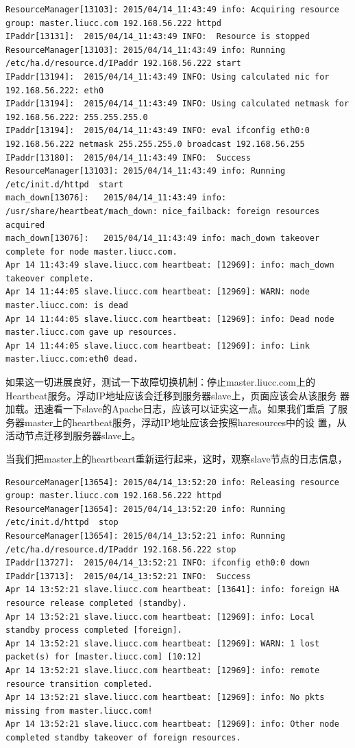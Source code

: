 \begin{verbatim}
ResourceManager[13103]:	2015/04/14_11:43:49 info: Acquiring resource group: master.liucc.com 192.168.56.222 httpd
IPaddr[13131]:	2015/04/14_11:43:49 INFO:  Resource is stopped
ResourceManager[13103]:	2015/04/14_11:43:49 info: Running /etc/ha.d/resource.d/IPaddr 192.168.56.222 start
IPaddr[13194]:	2015/04/14_11:43:49 INFO: Using calculated nic for 192.168.56.222: eth0
IPaddr[13194]:	2015/04/14_11:43:49 INFO: Using calculated netmask for 192.168.56.222: 255.255.255.0
IPaddr[13194]:	2015/04/14_11:43:49 INFO: eval ifconfig eth0:0 192.168.56.222 netmask 255.255.255.0 broadcast 192.168.56.255
IPaddr[13180]:	2015/04/14_11:43:49 INFO:  Success
ResourceManager[13103]:	2015/04/14_11:43:49 info: Running /etc/init.d/httpd  start
mach_down[13076]:	2015/04/14_11:43:49 info: /usr/share/heartbeat/mach_down: nice_failback: foreign resources acquired
mach_down[13076]:	2015/04/14_11:43:49 info: mach_down takeover complete for node master.liucc.com.
Apr 14 11:43:49 slave.liucc.com heartbeat: [12969]: info: mach_down takeover complete.
Apr 14 11:44:05 slave.liucc.com heartbeat: [12969]: WARN: node master.liucc.com: is dead
Apr 14 11:44:05 slave.liucc.com heartbeat: [12969]: info: Dead node master.liucc.com gave up resources.
Apr 14 11:44:05 slave.liucc.com heartbeat: [12969]: info: Link master.liucc.com:eth0 dead.
\end{verbatim}

如果这一切进展良好，测试一下故障切换机制：停止master.liucc.com上的
Heartbeat服务。浮动IP地址应该会迁移到服务器slave上，页面应该会从该服务
器加载。迅速看一下slave的Apache日志，应该可以证实这一点。如果我们重启
了服务器master上的heartbeat服务，浮动IP地址应该会按照haresources中的设
置，从活动节点迁移到服务器slave上。

当我们把master上的heartbeart重新运行起来，这时，观察slave节点的日志信息，

\begin{verbatim}
ResourceManager[13654]:	2015/04/14_13:52:20 info: Releasing resource group: master.liucc.com 192.168.56.222 httpd
ResourceManager[13654]:	2015/04/14_13:52:20 info: Running /etc/init.d/httpd  stop
ResourceManager[13654]:	2015/04/14_13:52:21 info: Running /etc/ha.d/resource.d/IPaddr 192.168.56.222 stop
IPaddr[13727]:	2015/04/14_13:52:21 INFO: ifconfig eth0:0 down
IPaddr[13713]:	2015/04/14_13:52:21 INFO:  Success
Apr 14 13:52:21 slave.liucc.com heartbeat: [13641]: info: foreign HA resource release completed (standby).
Apr 14 13:52:21 slave.liucc.com heartbeat: [12969]: info: Local standby process completed [foreign].
Apr 14 13:52:21 slave.liucc.com heartbeat: [12969]: WARN: 1 lost packet(s) for [master.liucc.com] [10:12]
Apr 14 13:52:21 slave.liucc.com heartbeat: [12969]: info: remote resource transition completed.
Apr 14 13:52:21 slave.liucc.com heartbeat: [12969]: info: No pkts missing from master.liucc.com!
Apr 14 13:52:21 slave.liucc.com heartbeat: [12969]: info: Other node completed standby takeover of foreign resources.
\end{verbatim}

